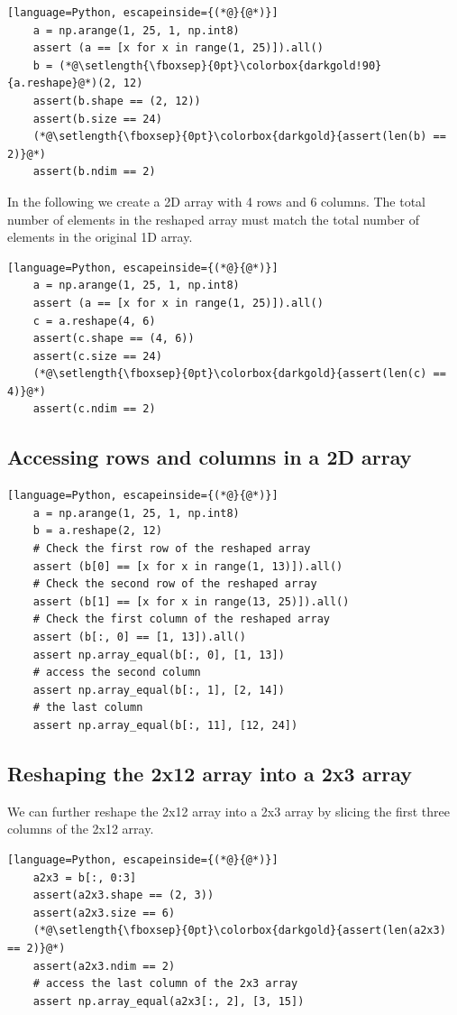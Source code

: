 \documentclass[12pt]{article}
\newcommand{\vsp}{\vspace*{8pt}}
\begin{document}
\vsp\begin{lstlisting}[language=Python, escapeinside={(*@}{@*)}]
    a = np.arange(1, 25, 1, np.int8)
    assert (a == [x for x in range(1, 25)]).all()
    b = (*@\setlength{\fboxsep}{0pt}\colorbox{darkgold!90}{a.reshape}@*)(2, 12)
    assert(b.shape == (2, 12))
    assert(b.size == 24)
    (*@\setlength{\fboxsep}{0pt}\colorbox{darkgold}{assert(len(b) == 2)}@*)
    assert(b.ndim == 2)
\end{lstlisting}

In the following we create a 2D array with 4 rows and 6 columns.
The total number of elements in the reshaped array must match
the total number of elements in the original 1D array.

\vsp\begin{lstlisting}[language=Python, escapeinside={(*@}{@*)}]
    a = np.arange(1, 25, 1, np.int8)
    assert (a == [x for x in range(1, 25)]).all()
    c = a.reshape(4, 6)
    assert(c.shape == (4, 6))
    assert(c.size == 24)
    (*@\setlength{\fboxsep}{0pt}\colorbox{darkgold}{assert(len(c) == 4)}@*)
    assert(c.ndim == 2)
\end{lstlisting}

\subsection{Accessing rows and columns in a 2D array}
\vsp\begin{lstlisting}[language=Python, escapeinside={(*@}{@*)}]
    a = np.arange(1, 25, 1, np.int8)
    b = a.reshape(2, 12)
    # Check the first row of the reshaped array
    assert (b[0] == [x for x in range(1, 13)]).all()
    # Check the second row of the reshaped array
    assert (b[1] == [x for x in range(13, 25)]).all()
    # Check the first column of the reshaped array
    assert (b[:, 0] == [1, 13]).all()
    assert np.array_equal(b[:, 0], [1, 13])
    # access the second column
    assert np.array_equal(b[:, 1], [2, 14])
    # the last column
    assert np.array_equal(b[:, 11], [12, 24])
\end{lstlisting}

\subsection{Reshaping the 2x12 array into a 2x3 array}
We can further reshape the 2x12 array into a 2x3 array by slicing the first
three columns of the 2x12 array.

\vsp\begin{lstlisting}[language=Python, escapeinside={(*@}{@*)}]
    a2x3 = b[:, 0:3]
    assert(a2x3.shape == (2, 3))
    assert(a2x3.size == 6)
    (*@\setlength{\fboxsep}{0pt}\colorbox{darkgold}{assert(len(a2x3) == 2)}@*)
    assert(a2x3.ndim == 2)
    # access the last column of the 2x3 array
    assert np.array_equal(a2x3[:, 2], [3, 15])
\end{lstlisting}
\end{document}
